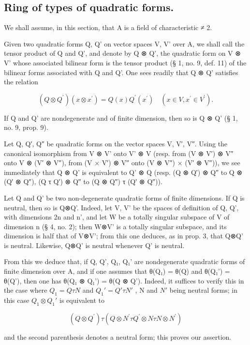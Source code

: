 \subsection{Ring of types of quadratic forms.}

We shall assume, in this section, that A is a field of characteristic ≠ 2.

Given two quadratic forms Q, Q' on vector spaces V, V' over A, we shall call the tensor product of Q and Q', and denote by Q ⊗ Q', the quadratic form on V ⊗ V' whose associated bilinear form is the tensor product (§ 1, no. 9, def. 11) of the bilinear forms associated with Q and Q'. One sees readily that Q ⊗ Q' satisfies the relation

\[
(Q \otimes Q ^ {\prime}) (x \otimes x ^ {\prime}) = Q (x) Q ^ {\prime} (x ^ {\prime}) \quad (x \in V, x ^ {\prime} \in V ^ {\prime}).\tag{5}
\]

If Q and Q' are nondegenerate and of finite dimension, then so is Q ⊗ Q' (§ 1, no. 9, prop. 9).

Let Q, Q′, Q″ be quadratic forms on the vector spaces V, V′, V″. Using the canonical isomorphism from V ⊗ V' onto V' ⊗ V (resp. from (V ⊗ V′) ⊗ V″ onto V ⊗ (V′ ⊗ V″), from (V × V′) ⊗ V″ onto (V ⊗ V″) × (V′ ⊗ V″)), we see immediately that Q ⊗ Q' is equivalent to Q' ⊗ Q (resp. (Q ⊗ Q′) ⊗ Q″ to Q ⊗ (Q′ ⊗ Q″), (Q τ Q′) ⊗ Q″ to (Q ⊗ Q″) τ (Q′ ⊗ Q″)).

Let Q and Q' be two non-degenerate quadratic forms of finite dimensions. If Q is neutral, then so is Q⊗Q'. Indeed, let V, V' be the spaces of definition of Q, Q', with dimensions 2n and n', and let W be a totally singular subspace of V of dimension n (§ 4, no. 2); then W⊗V' is a totally singular subspace, and its dimension is half that of V⊗V'; from this one deduces, as in prop. 3, that Q⊗Q' is neutral. Likewise, Q⊗Q' is neutral whenever Q' is neutral.

From this we deduce that, if Q, Q', Q₁, Q₁' are nondegenerate quadratic forms of finite dimension over A, and if one assumes that θ(Q₁) = θ(Q) and θ(Q₁') = θ(Q'), then one has θ(Q₁ ⊗ Q₁') = θ(Q ⊗ Q'). Indeed, it suffices to verify this in the case where \(Q_{1} = Q \tau N\) and \(Q_{1}' = Q' \tau N'\) , N and \(N'\) being neutral forms; in this case \(Q_{1} \otimes Q_{1}'\) is equivalent to

\[
(Q \otimes Q ^ {\prime}) \tau (Q \otimes N ^ {\prime} \tau Q ^ {\prime} \otimes N \tau N \otimes N ^ {\prime})
\]

and the second parenthesis denotes a neutral form; this proves our assertion.

